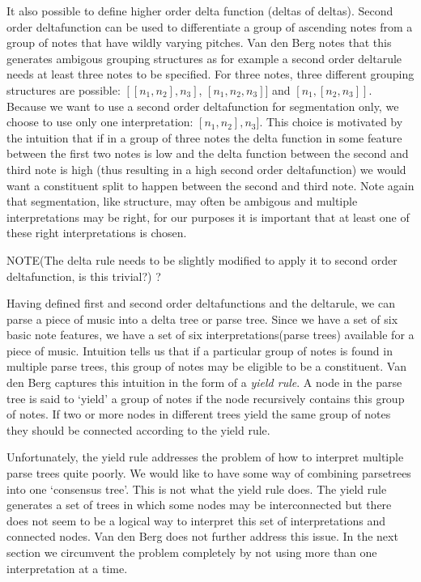 \documentclass[a4paper,10pt]{article}
\begin{document}
It also possible to define higher order delta function (deltas of deltas). Second order deltafunction can be used to differentiate a group of ascending notes from a group of notes that have wildly varying pitches. Van den Berg notes that this generates ambigous grouping structures as for example a second order deltarule needs at least three notes to be specified. For three notes, three different grouping structures are possible: $[[n_1, n_2], n_3]$, $[n_1, n_2, n_3]]$ and $[n_1, [n_2, n_3]]$. Because we want to use a second order deltafunction for segmentation only, we choose to use only one interpretation: $[n_1, n_2], n_3]$. This choice is motivated by the intuition that if in a group of three notes the delta function in some feature between the first two notes is low and the delta function between the second and third note is high (thus resulting in a high second order deltafunction) we would want a constituent split to happen between the second and third note. Note again that segmentation, like structure, may often be ambigous and multiple interpretations may be right, for our purposes it is important that at least one of these right interpretations is chosen. 

NOTE(The delta rule needs to be slightly modified to apply it to second order deltafunction, is this trivial?) ?

Having defined first and second order deltafunctions and the deltarule, we can parse a piece of music into a delta tree or parse tree. Since we have a set of six basic note features, we have a set of six interpretations(parse trees) available for a piece of music. Intuition tells us that if a particular group of notes is found in multiple parse trees, this group of notes may be eligible to be a constituent. Van den Berg captures this intuition in the form of a \textit{yield rule}. A node in the parse tree is said to `yield' a group of notes if the node recursively contains this group of notes. If two or more nodes in different trees yield the same group of notes they should be connected according to the yield rule.

Unfortunately, the yield rule addresses the problem of how to interpret multiple parse trees quite poorly. We would like to have some way of combining parsetrees into one `consensus tree'. This is not what the yield rule does. The yield rule generates a set of trees in which some nodes may be interconnected but there does not seem to be a logical way to interpret this set of interpretations and connected nodes. Van den Berg does not further address this issue. In the next section we circumvent the problem completely by not using more than one interpretation at a time.
\end{document}
